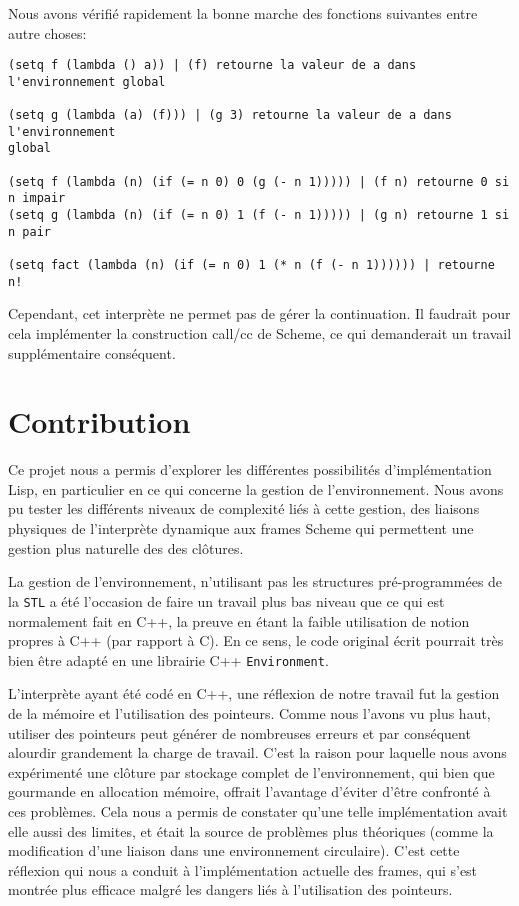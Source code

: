 \documentclass[a4paper,11pt]{article}
\begin{document}
 Nous avons vérifié rapidement la bonne marche des fonctions suivantes entre
 autre choses:

\begin{lstlisting}
(setq f (lambda () a)) | (f) retourne la valeur de a dans l'environnement global

(setq g (lambda (a) (f))) | (g 3) retourne la valeur de a dans l'environnement
global

(setq f (lambda (n) (if (= n 0) 0 (g (- n 1))))) | (f n) retourne 0 si n impair
(setq g (lambda (n) (if (= n 0) 1 (f (- n 1))))) | (g n) retourne 1 si n pair

(setq fact (lambda (n) (if (= n 0) 1 (* n (f (- n 1)))))) | retourne n!
\end{lstlisting}
 
 Cependant, cet interprète ne permet pas de gérer la continuation. Il faudrait pour 
 cela implémenter la construction call/cc de Scheme, ce qui demanderait un travail supplémentaire 
 conséquent.


\section{Contribution}

Ce projet nous a permis d'explorer les différentes possibilités d'implémentation 
Lisp, en particulier en ce qui concerne la gestion de l'environnement. Nous avons pu 
tester les différents niveaux de complexité liés à cette gestion, des liaisons physiques
de l'interprète dynamique aux frames Scheme qui permettent une gestion plus naturelle des
des clôtures.

La gestion de l'environnement, n'utilisant pas les structures pré-programmées de
la \texttt{STL} a été l'occasion de faire un travail plus bas niveau que ce qui
est normalement fait en C++, la preuve en étant la faible utilisation de
notion propres à C++ (par rapport à C). En ce sens, le code original écrit
pourrait très bien être adapté en une librairie C++ \texttt{Environment}.

L'interprète ayant été codé en C++, une réflexion de notre travail fut la gestion de la 
mémoire et l’utilisation des pointeurs. Comme nous l'avons vu plus haut, utiliser 
des pointeurs peut générer de nombreuses erreurs et par conséquent alourdir grandement la charge 
de travail. C'est la raison pour laquelle nous avons expérimenté une clôture par stockage 
complet de l'environnement, qui bien que gourmande en allocation mémoire, offrait l'avantage 
d'éviter d'être confronté à ces problèmes. Cela nous a permis de constater qu'une telle 
implémentation avait elle aussi des limites, et était la source de problèmes plus théoriques 
(comme la modification d'une liaison dans une environnement circulaire). C'est cette réflexion 
qui nous a conduit à l'implémentation actuelle des frames, qui s'est montrée plus efficace 
malgré les dangers liés à l'utilisation des pointeurs.
\end{document}
